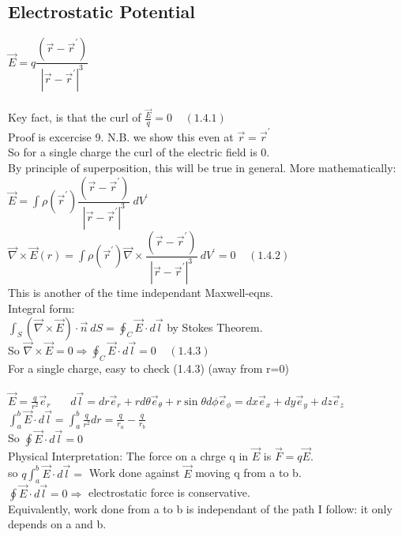 \documentclass[a4paper,11pt]{article}
\begin{document}
\subsection{Electrostatic Potential}

$\vec{E}=q\dfrac{(\vec{r}-\vec{r}^{'})}{|\vec{r} - \vec{r}^{'}|^3}$\\
\\
Key fact, is that the curl of $\frac{\vec{E}}{q} = 0~~~~~(1.4.1)$\\
Proof is excercise 9. N.B. we show this even at $\vec{r}=\vec{r}^{'}$\\
So for a single charge the curl of the electric field is 0.\\
By principle of superposition, this will be true in general. More mathematically:\\
$\vec{E}=\int \rho(\vec{r}^{'}) \dfrac{(\vec{r}-\vec{r}^{'})}{|\vec{r} - \vec{r}^{'}|^3} ~dV^{'}$\\
$\vec{\nabla} \times \vec{E}(r)=\int \rho(\vec{r}^{'}) \vec{\nabla} \times\dfrac{(\vec{r}-\vec{r}^{'})}{|\vec{r} - \vec{r}^{'}|^3} ~dV^{'}=0~~~~~(1.4.2)$\\
This is another of the time independant Maxwell-eqns.\\
Integral form:\\
$\int_S (\vec{\nabla} \times \vec{E})\cdot \vec{n} ~dS =\oint_C \vec{E} \cdot d\vec{l}$ by Stokes Theorem.\\
So $\vec{\nabla}\times \vec{E} = 0 \Rightarrow \oint_C \vec{E} \cdot d\vec{l} = 0~~~~~(1.4.3)$\\
For a single charge, easy to check (1.4.3) (away from r=0)\\
\\
$\vec{E} = \frac{q}{r^2}\vec{e}_r~~~~~~~~d\vec{l}=dr \vec{e}_r + rd\theta \vec{e}_\theta +r\sin{\theta} d\phi \vec{e}_\phi=dx\vec{e}_x +dy\vec{e}_y +dz\vec{e}_z$\\
$\int^b _a \vec{E}\cdot d\vec{l}=\int^b _a \frac{q}{r^2} dr = \frac{q}{r_a}-\frac{q}{r_b}$\\
So $\oint \vec{E} \cdot d\vec{l} = 0$\\
Physical Interpretation: The force on a chrge q in $\vec{E}$ is $\vec{F}=q\vec{E}$.\\
so $q\int^b _a \vec{E} \cdot d\vec{l} =$ Work done against $\vec{E}$ moving q from a to b.\\
$\oint \vec{E} \cdot d\vec{l} = 0 \Rightarrow$ electrostatic force is conservative.\\
Equivalently, work done from a to b is independant of the path I follow: it only depends on a and b.\\
\end{document}
